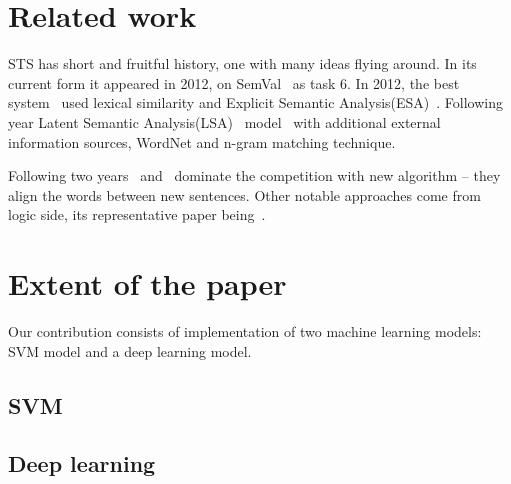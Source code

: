 \documentclass[10pt, a4paper]{article}
\begin{document}
\section{Related work}

STS has short and fruitful history, one with many ideas flying around. In its current form it appeared in 2012, on SemVal~\citep{agirre2012semeval} as task 6.  In 2012, the best system~\citep{bar2012ukp} used lexical similarity and Explicit Semantic Analysis(ESA)~\citep{gabrilovich2007computing}. Following year Latent Semantic Analysis(LSA)~\citep{deerwester1990indexing} model~\citep{han2013umbc} with additional external information sources, WordNet and n-gram matching technique.

Following two years~\citep{sultan2014dls} and~\citep{sultan2015dls} dominate the competition with new algorithm -- they align the words between new sentences. Other notable approaches come from logic side, its representative paper being~\citep{beltagy2014probabilistic}.

\section{Extent of the paper}

Our contribution consists of implementation of two machine learning models: SVM model and a deep learning model.

\subsection{SVM}

\subsection{Deep learning}
\end{document}
